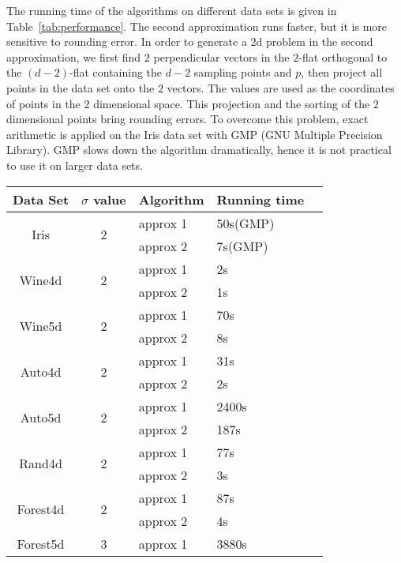\documentclass{patmorin}
\begin{document}
The running time of the algorithms on different data sets is given in Table~\ref{tab:performance}. The second approximation runs faster, but it is more sensitive to rounding error. In order to generate a 2d problem in the second approximation, we first find $2$ perpendicular vectors in the $2$-flat orthogonal to the $(d-2)$-flat containing the $d-2$ sampling points and $p$, then project all points in the data set onto the $2$ vectors. The values are used as the coordinates of points in the $2$ dimensional space. This projection and the sorting of the $2$ dimensional points bring rounding errors. To overcome this problem, exact arithmetic is applied on the Iris data set with GMP (GNU Multiple Precision Library). GMP slows down the algorithm dramatically, hence it is not practical to use it on larger data sets.
\begin{table}[!htb]
  \centering
  \begin{tabular}[center]{|c|c|l|l|l|}
    \hline
    Data Set & $\sigma$ value & Algorithm & Running time & \\ %
    \hline
    \multirow{2}{*}{Iris} & \multirow{2}{*}{2} & approx 1  & 50s(GMP) & \\
    & & approx 2 & 7s(GMP) & \\
    \hline
    \multirow{2}{*}{Wine4d} & \multirow{2}{*}{2} & approx 1 & 2s & \\
    & & approx 2 & 1s & \\
    \hline
    \multirow{2}{*}{Wine5d} & \multirow{2}{*}{2} & approx 1 & 70s & \\
    & & approx 2 & 8s & \\
    \hline
    \multirow{2}{*}{Auto4d} & \multirow{2}{*}{2} & approx 1 & 31s & \\
    & & approx 2 & 2s & \\
    \hline
    \multirow{2}{*}{Auto5d} & \multirow{2}{*}{2} & approx 1 & 2400s & \\
    & & approx 2 & 187s & \\
    \hline
    \multirow{2}{*}{Rand4d} & \multirow{2}{*}{2} & approx 1 & 77s & \\
    & & approx 2 & 3s & \\
    \hline
    \multirow{2}{*}{Forest4d} & \multirow{2}{*}{2} & approx 1 & 87s & \\
    & & approx 2 & 4s & \\
    \hline
    \multirow{2}{*}{Forest5d} & \multirow{2}{*}{3} & approx 1 & 3880s & \\

\end{tabular}
\end{table}
\end{document}
